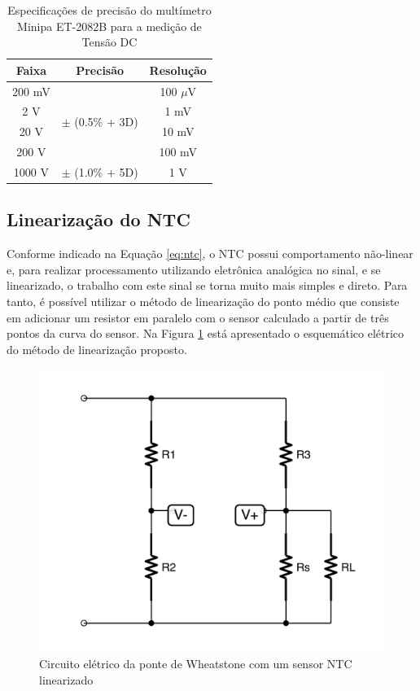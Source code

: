 \documentclass[a4paper]{instrumentacao}
\begin{document}
\begin{table}[H]
\centering
\caption{Especificações de precisão do multímetro Minipa ET-2082B para a medição de Tensão DC}
\label{tab:precisão-multimetro}
\begin{tabular}{|c|c|c|}
\hline
\textbf{Faixa} & \textbf{Precisão} & \textbf{Resolução} \\ \hline
200 mV         & \multirow{4}{*}{$\pm$ (0.5\% + 3D)} & 100 $\mu$V \\ \cline{1-1} \cline{3-3} 
2 V            &                              & 1 mV               \\ \cline{1-1} \cline{3-3} 
20 V           &                              & 10 mV              \\ \cline{1-1} \cline{3-3} 
200 V          &                              & 100 mV             \\ \hline
1000 V         & $\pm$ (1.0\% + 5D)           & 1 V                \\ \hline
\end{tabular}
\end{table}

\subsection{Linearização do NTC}
\label{sec:ntc-linearizacao}

Conforme indicado na Equação \ref{eq:ntc}, o NTC possui comportamento não-linear e, para realizar processamento utilizando eletrônica analógica no sinal, e se linearizado, o trabalho com este sinal se torna muito mais simples e direto. Para tanto, é possível utilizar o método de linearização do ponto médio que consiste em adicionar um resistor em paralelo com o sensor calculado a partir de três pontos da curva do sensor. Na Figura \ref{fig:ntc-linear} está apresentado o esquemático elétrico do método de linearização proposto.

\begin{figure}[H]
\center
\includegraphics[width=\textwidth]{Wheatstone-NTC-Linear.pdf}
\caption{Circuito elétrico da ponte de Wheatstone com um sensor NTC linearizado}
\label{fig:ntc-linear}
\end{figure}
\end{document}
